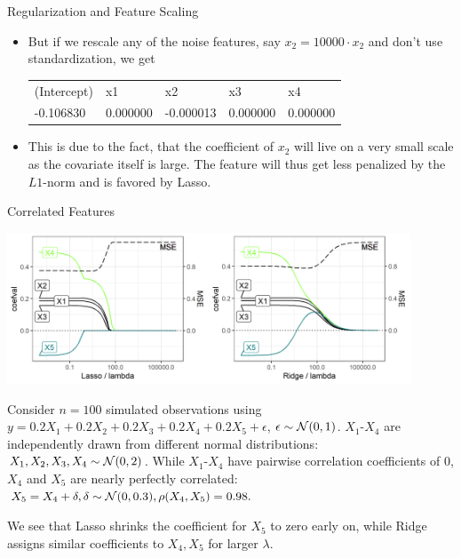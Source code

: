 \documentclass[11pt,compress,t,notes=noshow, xcolor=table]{beamer}
\begin{document}
\begin{vbframe}{Regularization and Feature Scaling}
\begin{itemize}
\normalsize
\item But if we rescale any of the noise features, say $x_2 = 10000 \cdot x_2$ and don't use standardization, we get
\footnotesize
\vspace{0.2cm}

\begin{table}[]
\begin{tabular}{lllll}
(Intercept) & x1       & x2        & x3       & x4       \\
-0.106830   & 0.000000 & -0.000013 & 0.000000 & 0.000000         
\end{tabular}
\end{table}

\normalsize

\item This is due to the fact, that the coefficient of $x_2$ will live on a very small scale as the covariate itself is large. The feature will thus get less penalized by the $L1$-norm and is favored by Lasso.
\end{itemize}

\end{vbframe}

\begin{vbframe}{Correlated Features}


\includegraphics[width=0.9\textwidth]{figure/regu_example_multicollinearity.png}

Consider $n=100$ simulated observations using $y = 0.2X_1 + 0.2X_2 + 0.2X_3 + 0.2X_4 + 0.2X_5 + \epsilon$, $\epsilon \sim \mathcal{N} (0,1)$. $X_1$-$X_4$ are independently drawn from different normal distributions: $X_1, X_2, X_3, X_4 \sim \mathcal{N} (0,2)$. While $X_1$-$X_4$ have pairwise correlation coefficients of 0, $X_4$ and $X_5$ are nearly perfectly correlated: $X_5 = X_4 + \delta, \delta \sim \mathcal{N} (0,0.3), \rho(X_4, X_5) = 0.98. $

\vspace{0.1cm}

We see that Lasso shrinks the coefficient for $X_5$ to zero early on, while Ridge assigns similar coefficients to $X_4, X_5$ for larger $\lambda$.

\end{vbframe}
\end{document}
